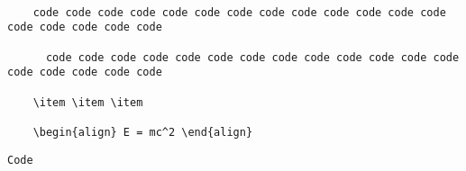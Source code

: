 \documentclass{article}
\begin{document}
    \begin{verbatim}

    code code code code code code code code code code code code code code code code code code

      code code code code code code code code code code code code code code code code code code

    \item \item \item

    \begin{align} E = mc^2 \end{align}

    \end{verbatim}

\begin{lstlisting}[caption={A very long and complicated caption that does not fit into one line}]
  Code
\end{lstlisting}
\end{document}
